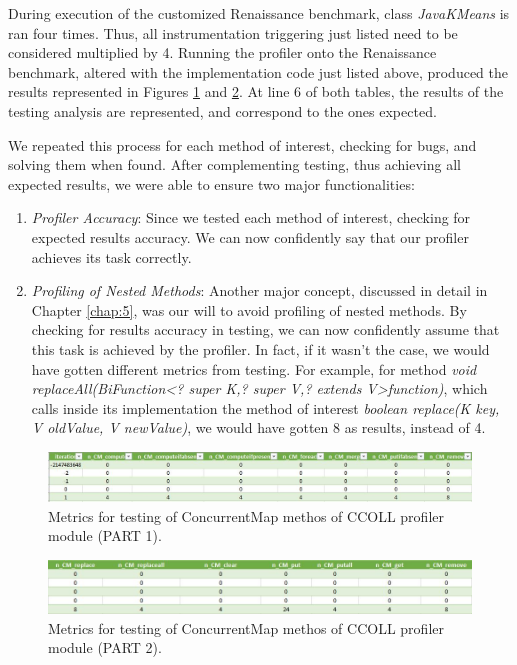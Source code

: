 \documentclass[]{usiinfthesis}
\begin{document}
During execution of the customized Renaissance \cite{Renaissance} benchmark, class \textit{JavaKMeans} is ran four times. Thus, all instrumentation triggering just listed need to be considered multiplied by 4. Running the profiler onto the Renaissance benchmark, altered with the implementation code just listed above, produced the results represented in Figures \ref{fig:7} and \ref{fig:8}. At line 6 of both tables, the results of the testing analysis are represented, and correspond to the ones expected.

We repeated this process for each method of interest, checking for bugs, and solving them when found. After complementing testing, thus achieving all expected results, we were able to ensure two major functionalities:
\begin{enumerate}
    \item \textit{Profiler Accuracy}: Since we tested each method of interest, checking for expected results accuracy. We can now confidently say that our profiler achieves its task correctly.    \item \textit{Profiling of Nested Methods}: Another major concept, discussed in detail in Chapter \ref{chap:5}, was our will to avoid profiling of nested methods. By checking for results accuracy in testing, we can now confidently assume that this task is achieved by the profiler. In fact, if it wasn't the case, we would have gotten different metrics from testing. For example, for method \textit{void replaceAll(BiFunction<? super K,? super V,? extends V>function)}, which calls inside its implementation the method of interest \textit{boolean replace(K key, V oldValue, V newValue)}, we would have gotten 8 as results, instead of 4.
\end{enumerate}


\begin{figure}[h]
    \centering
    \includegraphics[scale=0.5]{Immagini/testing.JPG} 
    \caption[Testing Metrics Example pt.1]{Metrics for testing of ConcurrentMap methos of CCOLL profiler module (PART 1).}
    \label{fig:7}
\end{figure}
\begin{figure}[h]
    \centering
    \includegraphics[scale=0.5]{Immagini/testing2.JPG} 
    \caption[Testing Metrics Example pt.2]{Metrics for testing of ConcurrentMap methos of CCOLL profiler module (PART 2).}
    \label{fig:8}
\end{figure}
\end{document}
